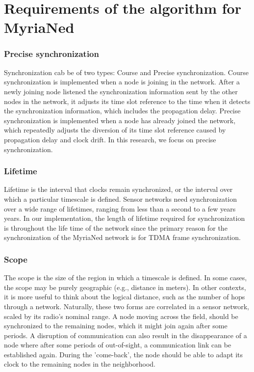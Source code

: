 \documentclass[a4paper,10pt]{report}
\begin{document}
\section{\textbf{Requirements of the algorithm for MyriaNed}}
\subsubsection{\textbf{Precise synchronization}}
Synchronization cab be of two types: Course and Precise synchronization. Course synchronization is implemented when a node is joining in the network. After a newly joining node listened the synchronization information sent by the other nodes in the network, it adjusts its time slot reference to the time when it detects the synchronization information, which includes the propagation delay. Precise synchronization is implemented when a node has already joined the network, which repeatedly adjusts the diversion of its time slot reference caused by propagation delay and clock drift. In this research, we focus on precise synchronization.
\subsubsection{\textbf{Lifetime}} Lifetime is the interval that clocks remain synchronized, or the interval over which a particular
timescale is defined. Sensor networks need synchronization over a wide range of lifetimes, ranging from less than a second to a few years
years. In our implementation, the length of lifetime required for synchronization is throughout the life time of the network since
the primary reason for the synchronization of the MyriaNed network is for TDMA frame synchronization.
\subsubsection{\textbf{Scope}} The scope is the size of the region in which a timescale is defined. In some cases, the scope may be purely geographic (e.g., distance in meters). In other contexts, it is more useful to think about the logical distance, such as the number of hops through a network. Naturally, these two forms are correlated in a sensor network, scaled by its radio's nominal range. A node moving across the field, should be synchronized to the remaining nodes, which it might join again after some periods. A disruption of communication can also result in the disappearance of a node where after some periods of out-of-sight, a communication link can be established again. During the 'come-back', the node should be able to adapt its clock to the remaining nodes in the neighborhood.
\end{document}
